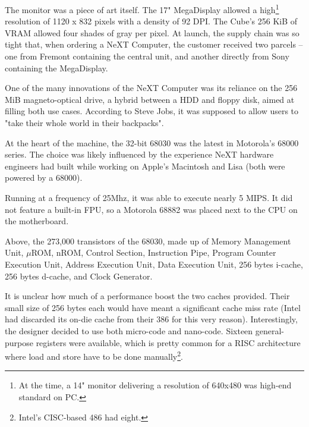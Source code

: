 The monitor was a piece of art itself. The 17" MegaDisplay allowed a high\footnote{At the time, a 14" monitor delivering a resolution of 640x480 was high-end standard on PC.} resolution of 1120 x 832 pixels with a density of 92 DPI. The Cube's 256 KiB of VRAM allowed four shades of gray per pixel. At launch, the supply chain was so tight that, when ordering a NeXT Computer, the customer received two parcels -- one from Fremont containing the central unit, and another directly from Sony containing the MegaDisplay.





\begin{figure}[H]
\centering
{}
\end{figure}
\par
One of the many innovations of the NeXT Computer was its reliance on the 256 MiB magneto-optical drive, a hybrid between a HDD and floppy disk, aimed at filling both use cases. According to Steve Jobs, it was supposed to allow users to "take their whole world in their backpacks".\\
\par
At the heart of the machine, the 32-bit 68030 was the latest in Motorola's 68000 series. The choice was likely influenced by the experience NeXT hardware engineers had built while working on Apple's Macintosh and Lisa (both were powered by a 68000).\\
\par
 Running at a frequency of 25Mhz, it was able to execute nearly 5 MIPS. It did not feature a built-in FPU, so a Motorola 68882 was placed next to the CPU on the motherboard. %



\begin{figure}[H]
\centering
{}
\end{figure}
\par
\vspace{-3mm}
Above, the 273,000 transistors of the 68030, made up of  Memory Management Unit,  $\mu$ROM,  nROM,  Control Section,  Instruction Pipe,  Program Counter Execution Unit,  Address Execution Unit,  Data Execution Unit,  256 bytes i-cache,  256 bytes d-cache, and  Clock Generator.\\         
\par
It is unclear how much of a performance boost the two caches provided. Their small size of 256 bytes each would have meant a significant cache miss rate (Intel had discarded its on-die cache from their 386 for this very reason). Interestingly, the designer decided to use both micro-code and nano-code. Sixteen general-purpose registers were available, which is pretty common for a RISC architecture where load and store have to be done manually\footnote{Intel's CISC-based 486 had eight.}.

